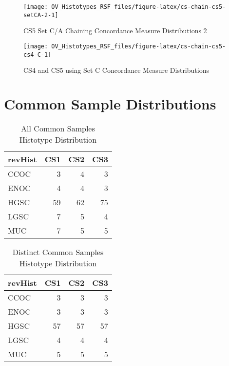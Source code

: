 \documentclass[
]{report}
\begin{document}
\begin{figure}[H]

{\centering \texttt{[image: OV\_Histotypes\_RSF\_files/figure-latex/cs-chain-cs5-setCA-2-1]} 

}

\caption{CS5 Set C/A Chaining Concordance  Measure Distributions 2}\label{fig:cs-chain-cs5-setCA-2}
\end{figure}

\begin{figure}[H]

{\centering \texttt{[image: OV\_Histotypes\_RSF\_files/figure-latex/cs-chain-cs5-cs4-C-1]} 

}

\caption{CS4 and CS5 using Set C Concordance Measure Distributions}\label{fig:cs-chain-cs5-cs4-C}
\end{figure}

\hypertarget{common-sample-distributions}{%
\section{Common Sample Distributions}\label{common-sample-distributions}}

\begin{table}

\caption{\label{tab:common-dist-all}All Common Samples Histotype Distribution}
\centering
\begin{tabular}[t]{l|r|r|r}
\hline
revHist & CS1 & CS2 & CS3\\
\hline
CCOC & 3 & 4 & 3\\
\hline
ENOC & 4 & 4 & 3\\
\hline
HGSC & 59 & 62 & 75\\
\hline
LGSC & 7 & 5 & 4\\
\hline
MUC & 7 & 5 & 5\\
\hline
\end{tabular}
\end{table}

\begin{table}

\caption{\label{tab:common-dist-distinct}Distinct Common Samples Histotype Distribution}
\centering
\begin{tabular}[t]{l|r|r|r}
\hline
revHist & CS1 & CS2 & CS3\\
\hline
CCOC & 3 & 3 & 3\\
\hline
ENOC & 3 & 3 & 3\\
\hline
HGSC & 57 & 57 & 57\\
\hline
LGSC & 4 & 4 & 4\\
\hline
MUC & 5 & 5 & 5\\
\hline
\end{tabular}
\end{table}
\end{document}
